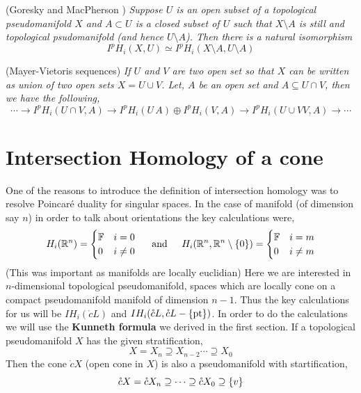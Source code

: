 \documentclass[11pt]{article}
\begin{document}
\noindent {}(Goresky and MacPherson \cite{GM_1990}) \textit{Suppose $U$ is an open subset of a topological pseudomanifold $X$ and $A \subset U$ is a closed subset of $U$ such that $X \setminus A$ is still and topological psudomanifold (and hence $U\setminus A$). Then there is a natural isomorphism} $$I^pH_i(X,U) \simeq I^pH_i(X \setminus A, U \setminus A)$$

\vspace*{0.2cm}

\noindent {} (Mayer-Vietoris sequences) \textit{If $U$ and $V$ are two open set so that $X$ can be written as union of two open sets $X= U \cup V$. Let, $A$ be an open set and $A \subseteq U \cap V$, then we have the following\les,}\[
\cdots \to I^pH_i(U\cap V, A)    \to  I^pH_i(U\, A) \oplus  I^pH_i(V, A) \to  I^pH_i(U\cup V V, A) \to \cdots          
\]

\section{Intersection Homology of a cone} 

\newcommand{\oc}{\mathring{c}} One of the reasons to introduce the definition of intersection homology was to resolve Poincaré duality for singular spaces. In the case of manifold (of dimension say $n$) in order to talk about orientations the key calculations were, 
\[
 H_i(\mathbb{R}^n) = \begin{cases}
    \mathbb{F} & i =0 \\
    0  & i \neq 0
 \end{cases}    \hspace*{0.4cm} \text{ and } \hspace*{0.4cm} H_i(\mathbb{R}^n, \mathbb{R}^n\setminus\qty{0}) = \begin{cases}
    \mathbb{F} & i =m \\
    0 & i \neq m
 \end{cases}
\] (This was important as manifolds are locally euclidian) Here we are interested in $n$-dimensional topological pseudomanifold, spaces which are locally cone on a compact pseudomanifold manifold of dimension $n-1$. Thus the key calculations for us will be $IH_{i}(\oc L)$ and $IH_{i}(\oc L, \oc L -\qty{\text{pt}})$. In order to do the calculations we will use the \textbf{Kunneth formula} we derived in the first section. If a topological pseudomanifold $X$ has the given stratification, $$X = X_n \supseteq X_{n-2} \cdots \supseteq X_0$$ Then the cone $\oc X$ (open cone in $X$) is also a pseudomanifold with startification, \[
\oc X = \oc X_{n}\supseteq \cdots \supseteq \oc X_0 \supseteq \qty{v}    
\]
\end{document}

